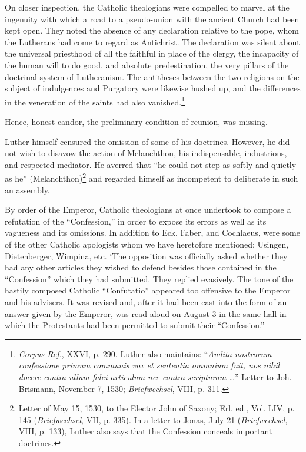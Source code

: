 On closer inspection, the Catholic theologians were compelled to
marvel at the ingenuity with which a road to a pseudo-union with the
ancient Church had been kept open. They noted the absence of any
declaration relative to the pope, whom the Lutherans had come to
regard as Antichrist. The declaration was silent about the universal
priesthood of all the faithful in place of the clergy, the incapacity
of the human will to do good, and absolute predestination, the very
pillars of the doctrinal system of Lutheranism. The antitheses between
the two religions on the subject of indulgences and Purgatory were
likewise hushed up, and the differences in the veneration of the saints
had also vanished.\footnote
{\textit{Corpus Ref.}, XXVI, p. 290. Luther also maintains: ``\textit{Audita nostrorum confessione
primum communis vox et sententia ommnium fuit, nos nihil docere contra ullum fidei
articulum nec contra scripturam \dots }'' Letter to Joh. Brismann, November 7, 1530;
\textit{Briefwechsel}, VIII, p. 311.}

Hence, honest candor, the preliminary condition of reunion, was
missing.

Luther himself censured the omission of some of his doctrines.
However, he did not wish to disavow the action of Melanchthon, his
indispensable, industrious, and respected mediator. He averred that
“he could not step as softly and quietly as he” (Melanchthon)\footnote
{Letter of May 15, 1530, to the Elector John of Saxony; Erl. ed., Vol. LIV, p. 145
(\textit{Briefwechsel}, VII, p. 335). In a letter to Jonas, July 21 (\textit{Briefwechsel}, VIII, p. 133),
Luther also says that the Confession conceals important doctrines.}
and regarded himself as incompetent to deliberate in such an assembly.

By order of the Emperor, Catholic theologians at once undertook
to compose a refutation of the “Confession,” in order to expose its
errors as well as its vagueness and its omissions. In addition to Eck,
Faber, and Cochlaeus, were some of the other Catholic apologists
whom we have heretofore mentioned: Usingen, Dietenberger, Wimpina, etc.
‘The opposition was officially asked whether they had any
other articles they wished to defend besides those contained in the
“Confession” which they had submitted. They replied evasively. The
tone of the hastily composed Catholic “Confutatio” appeared too offensive
to the Emperor and his advisers. It was revised and, after it had
been cast into the form of an answer given by the Emperor, was read
aloud on August 3 in the same hall in which the Protestants had been
permitted to submit their “Confession.”

